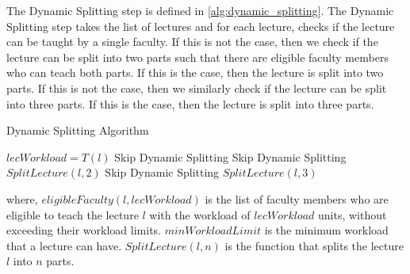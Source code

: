 The Dynamic Splitting step is defined in \autoref{alg:dynamic_splitting}. The Dynamic Splitting step takes the list of lectures and for each lecture, checks if the lecture can be taught by a single faculty. If this is not the case, then we check if the lecture can be split into two parts such that there are eligible faculty members who can teach both parts. If this is the case, then the lecture is split into two parts. If this is not the case, then we similarly check if the lecture can be split into three parts. If this is the case, then the lecture is split into three parts.

\begin{algorithm}[H]
  \caption{Dynamic Splitting Algorithm}
  \begin{algorithmic}[1]
    \State $lecWorkload = T(l)$
    \State Skip Dynamic Splitting
    \State Skip Dynamic Splitting
    \State $SplitLecture(l, 2)$
    \State Skip Dynamic Splitting
    \State $SplitLecture(l, 3)$
    \EndIf
    \EndFor
    \EndProcedure
  \end{algorithmic}
  \label{alg:dynamic_splitting}
\end{algorithm}

where, $eligibleFaculty(l, lecWorkload)$ is the list of faculty members who are eligible to teach the lecture $l$ with the workload of $lecWorkload$ units, without exceeding their workload limits. $minWorkloadLimit$ is the minimum workload that a lecture can have. $SplitLecture(l, n)$ is the function that splits the lecture $l$ into $n$ parts.

\begin{table}[H]
  \centering

  \caption{Dynamic Splitting Results}
  \label{tab:dynamic_splitting_results}
\end{table}

